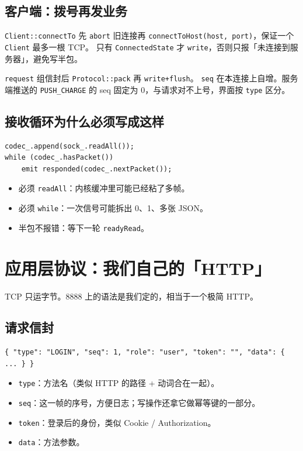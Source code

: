 \documentclass[UTF8,a4paper,11pt]{ctexart}
\begin{document}
\subsection{客户端：拨号再发业务}

\texttt{Client::connectTo} 先 \texttt{abort} 旧连接再 \texttt{connectToHost(host, port)}，保证一个 \texttt{Client} 最多一根 TCP。
只有 \texttt{ConnectedState} 才 \texttt{write}，否则只报「未连接到服务器」，避免写半包。

\texttt{request} 组信封后 \texttt{Protocol::pack} 再 \texttt{write+flush}。
\texttt{seq} 在本连接上自增。服务端推送的 \texttt{PUSH\_CHARGE} 的 seq 固定为 0，与请求对不上号，界面按 \texttt{type} 区分。

\subsection{接收循环为什么必须写成这样}

\begin{lstlisting}
codec_.append(sock_.readAll());
while (codec_.hasPacket())
    emit responded(codec_.nextPacket());
\end{lstlisting}

\begin{itemize}[leftmargin=1.4em]
  \item 必须 \texttt{readAll}：内核缓冲里可能已经粘了多帧。
  \item 必须 \texttt{while}：一次信号可能拆出 0、1、多张 JSON。
  \item 半包不报错：等下一轮 \texttt{readyRead}。
\end{itemize}

\section{应用层协议：我们自己的「HTTP」}

TCP 只运字节。8888 上的语法是我们定的，相当于一个极简 HTTP。

\subsection{请求信封}

\begin{lstlisting}[language={}]
{ "type": "LOGIN", "seq": 1, "role": "user", "token": "", "data": { ... } }
\end{lstlisting}

\begin{itemize}[leftmargin=1.4em]
  \item \texttt{type}：方法名（类似 HTTP 的路径 + 动词合在一起）。
  \item \texttt{seq}：这一帧的序号，方便日志；写操作还拿它做幂等键的一部分。
  \item \texttt{token}：登录后的身份，类似 Cookie / Authorization。
  \item \texttt{data}：方法参数。
\end{itemize}
\end{document}
